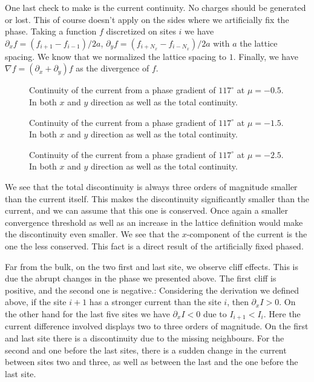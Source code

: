 \documentclass[..\main.tex]{subfile}
\begin{document}
One last check to make is the current continuity. No charges should be generated or lost. This of course doesn't apply on
the sides where we artificially fix the phase. Taking a function $f$ discretized on sites $i$ we have $\partial_x f = (f_{i+1} - f_{i-1} )/2a$,
$\partial_y f = (f_{i+N_x} - f_{i-N_x} )/2a$ with
$a$ the lattice spacing. We know that we normalized the lattice spacing to $1$. Finally, we have $\nabla f = (\partial_x + \partial_y) f$ as the divergence
of $f$.
\begin{figure}[H]
    \centering
    
    \caption{Continuity of the current from a phase gradient of $117^{\circ}$ at $\mu = -0.5$. In both $x$ and $y$ direction as
    well as the total continuity.}
\end{figure}
\begin{figure}[H]
    \centering
    
    \caption{Continuity of the current from a phase gradient of $117^{\circ}$ at $\mu = -1.5$. In both $x$ and $y$ direction as
    well as the total continuity.}
\end{figure}
\begin{figure}[H]
    \centering
    
    \caption{Continuity of the current from a phase gradient of $117^{\circ}$ at $\mu = -2.5$. In both $x$ and $y$ direction as
    well as the total continuity.}
\end{figure}
We see that the total discontinuity is always three orders of magnitude smaller than the current itself. This makes the discontinuity
significantly smaller than the current, and we can assume that this one is conserved. Once again a smaller convergence threshold
as well as an increase in the lattice definition would make the discontinuity even smaller.
We see that the $x$-component of the current is the one the less conserved. This fact is a direct result of the artificially fixed phased.

Far from the bulk, on the two first and last site, we observe cliff effects. This is due the abrupt changes in the phase we presented above.
The first cliff is positive, and the second one is negative.:
Considering the derivation we defined above, if the site $i+1$ has a stronger current than the site $i$, then $\partial_x I > 0$.
On the other hand for the last five sites we have $\partial_x I <0$ due to $I_{i+1}< I_i$. Here the current difference involved displays two to three orders of magnitude.
On the first and last site there is a discontinuity due to the missing neighbours. For the second and one before the last sites, there is a sudden change in the current
between sites two and three, as well as between the last and the one before the last site.\\
\end{document}
